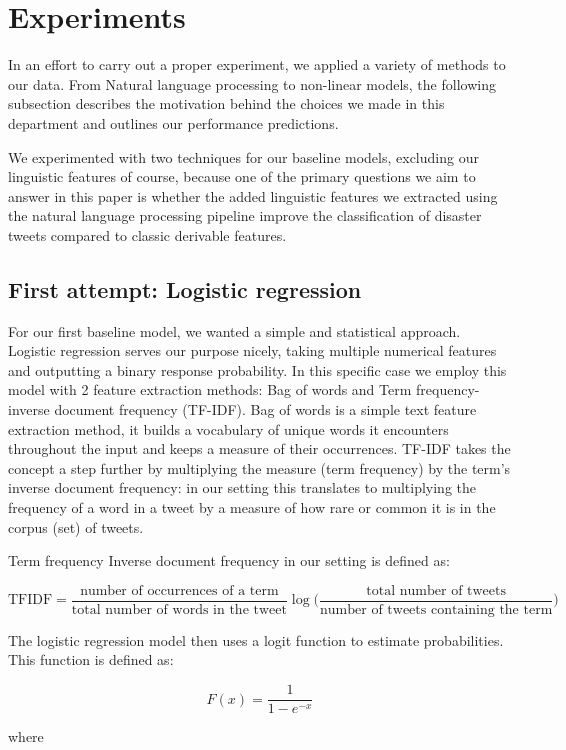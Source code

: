 \section{Experiments}
In an effort to carry out a proper experiment, we applied a variety of methods to our data.
From Natural language processing to non-linear models, the following subsection describes the motivation behind the choices we made in this department and outlines our performance predictions.

We experimented with two techniques for our baseline models, excluding our linguistic features of course, because one of the primary questions we aim to answer in this paper is whether the added linguistic features we extracted using the natural language processing pipeline improve the classification of disaster tweets compared to classic derivable features.

\subsection{First attempt: Logistic regression}

For our first baseline model, we wanted a simple and statistical approach.
Logistic regression serves our purpose nicely, taking multiple numerical features and outputting a binary response probability.
In this specific case we employ this model with 2 feature extraction methods: Bag of words and Term frequency-inverse document frequency (TF-IDF).
Bag of words is a simple text feature extraction method, it builds a vocabulary of unique words it encounters throughout the input and keeps a measure of their occurrences.
TF-IDF takes the concept a step further by multiplying the measure (term frequency) by the term's inverse document frequency: in our setting this translates to multiplying the frequency of a word in a tweet by a measure of how rare or common it is in the corpus (set) of tweets.

Term frequency Inverse document frequency in our setting is defined as:

$$
\text{TFIDF} = \frac{\text{number of occurrences of a term}}{\text{total number of words in the tweet}} \log{\Big( \frac{\text{total number of tweets}}{\text{number of tweets containing the term}} \Big)}
$$

The logistic regression model then uses a logit function to estimate probabilities. This function is defined as:

$$
F(x) = \frac{1}{1-e^{-x}}
$$

where


